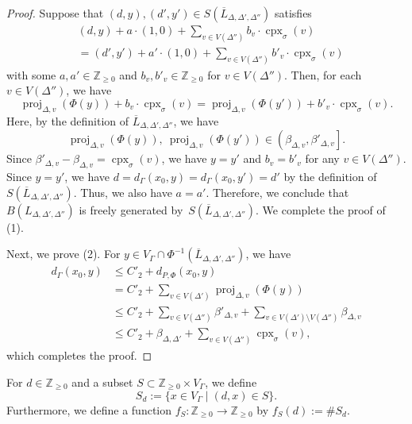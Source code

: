 \begin{proof}
Suppose that $(d, y), (d', y') \in S \left(\overline{L}_{\Delta, \Delta ', \Delta''} \right)$ satisfies 
\begin{align*}
&(d,y) + a \cdot (1,0) + \sum _{v \in V(\Delta '')} b_v \cdot \operatorname{cpx}_{\sigma}(v)\\
&= 
(d',y') + a' \cdot (1,0) + \sum _{v \in V(\Delta '')} b'_v \cdot \operatorname{cpx}_{\sigma}(v)
\end{align*}
with some $a, a' \in \mathbb{Z}_{\ge 0}$ and $b_v, b'_v \in \mathbb{Z}_{\ge 0}$ for $v \in V(\Delta '')$. 
Then, for each $v \in V(\Delta '')$, we have 
\[
\operatorname{proj}_{\Delta, v} (\Phi (y) ) + b_v \cdot \operatorname{cpx}_{\sigma}(v) = 
\operatorname{proj}_{\Delta, v} (\Phi(y')) + b'_v \cdot \operatorname{cpx}_{\sigma}(v). 
\]
Here, by the definition of $\overline{L}_{\Delta, \Delta ', \Delta''}$, 
we have 
\[
\operatorname{proj}_{\Delta, v} (\Phi (y) ), \ \operatorname{proj}_{\Delta, v} (\Phi(y')) \in \left( \beta_{\Delta, v}, \beta' _{\Delta, v} \right]. 
\]
Since $\beta' _{\Delta, v} - \beta _{\Delta, v} = \operatorname{cpx}_{\sigma}(v) $, we have $y=y'$ and $b_v = b'_v$ for any $v \in V(\Delta '')$. 
Since $y = y'$, we have $d = d_{\Gamma} (x_0, y) = d_{\Gamma} (x_0, y')  = d'$ by the definition of $S \left(\overline{L}_{\Delta, \Delta ', \Delta''}  \right)$. 
Thus, we also have $a = a'$. 
Therefore, we conclude that $B \left( L_{\Delta, \Delta ', \Delta''} \right)$ is freely generated by~$S \left(\overline{L}_{\Delta, \Delta ', \Delta''}  \right)$. We complete the proof of (1). 

Next, we prove (2). 
For $y \in V_{\Gamma} \cap \Phi ^{-1}\left( \overline{L}_{\Delta, \Delta ', \Delta''} \right)$, we have 
\begin{align*}
d_{\Gamma}(x_0, y)
&\le C' _2 + d_{P, \Phi}(x_0, y) \\
&= C' _2 + \sum _{v \in V(\Delta ')} \operatorname{proj}_{\Delta, v}(\Phi(y)) \\
&\le C'_2 + \sum _{v \in V(\Delta '')} \beta' _{\Delta, v} + \sum _{v \in V(\Delta ') \setminus V(\Delta '')} \beta _{\Delta, v}\\
&\le C'_2 + \beta _{\Delta, \Delta '} + \sum _{v \in V(\Delta '')} \operatorname{cpx}_{\sigma}(v), 
\end{align*}
which completes the proof. 
\end{proof}





\begin{defn}
For $d \in \mathbb{Z}_{\ge 0}$ and a subset $S \subset \mathbb{Z}_{\ge 0} \times V_{\Gamma}$, we define 
\[
S_d := \{ x \in V_{\Gamma} \mid (d,x) \in S \}. 
\]
Furthermore, we define a function $f_{S} : \mathbb{Z}_{\ge 0} \to \mathbb{Z}_{\ge 0}$ by $f_{S} (d) := \# S_d$. 
\end{defn}

